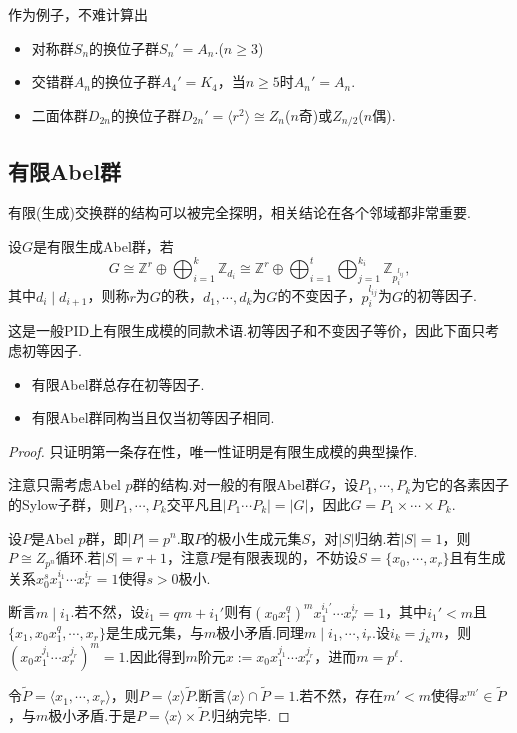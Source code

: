 作为例子，不难计算出
\begin{itemize}
	\item 对称群$S_n$的换位子群$S_n'=A_n$.($n\ge 3$)
	\item 交错群$A_n$的换位子群$A_4'=K_4$，当$n\ge 5$时$A_n'=A_n$.
	\item 二面体群$D_{2n}$的换位子群$D_{2n}'=\langle r^2\rangle\cong Z_n$($n$奇)或$Z_{n/2}$($n$偶).
\end{itemize}

\subsection{有限Abel群}
有限(生成)交换群的结构可以被完全探明，相关结论在各个邻域都非常重要.
\begin{definition}
	设$G$是有限生成Abel群，若
	\[
		G\cong\mathbb{Z}^r\oplus\bigoplus_{i=1}^k\mathbb{Z}_{d_i}\cong\mathbb{Z}^r\oplus\bigoplus_{i=1}^t\bigoplus_{j=1}^{k_i}\mathbb{Z}_{p_i^{l_{ij}}},
	\]
	其中$d_i\mid d_{i+1}$，则称$r$为$G$的{\heiti 秩}，$d_1,\cdots,d_k$为$G$的{\heiti 不变因子}，$p_i^{l_{ij}}$为$G$的{\heiti 初等因子}.
\end{definition}
\begin{remark}
	这是一般PID上有限生成模的同款术语.初等因子和不变因子等价，因此下面只考虑初等因子.
\end{remark}
\begin{thm}[(有限Abel群结构)]
	\begin{itemize}
		\item 有限Abel群总存在初等因子.
		\item 有限Abel群同构当且仅当初等因子相同.
	\end{itemize}\hypertarget{thm:FiniteAbelStruc}{}
\end{thm}
\begin{proof}
	只证明第一条存在性，唯一性证明是有限生成模的典型操作.
	
	注意只需考虑Abel $p$群的结构.对一般的有限Abel群$G$，设$P_1,\cdots,P_k$为它的各素因子的Sylow子群，则$P_1,\cdots,P_k$交平凡且$|P_1\cdots P_k|=|G|$，因此$G=P_1\times\cdots\times P_k$.

	设$P$是Abel $p$群，即$|P|=p^n$.取$P$的极小生成元集$S$，对$|S|$归纳.若$|S|=1$，则$P\cong Z_{p^n}$循环.若$|S|=r+1$，注意$P$是有限表现的，不妨设$S=\{x_0,\cdots,x_r\}$且有生成关系$x_0^sx_1^{i_1}\cdots x_r^{i_r}=1$使得$s>0$极小.

	断言$m\mid i_1$.若不然，设$i_1=qm+i_1'$则有$(x_0x_1^q)^mx_1^{i_1'}\cdots x_r^{i_r}=1$，其中$i_1'<m$且$\{x_1,x_0x_1^q,\cdots,x_r\}$是生成元集，与$m$极小矛盾.同理$m\mid i_1,\cdots,i_r$.设$i_k=j_km$，则$(x_0x_1^{j_1}\cdots x_r^{j_r})^m=1$.因此得到$m$阶元$x:=x_0x_1^{j_1}\cdots x_r^{j_r}$，进而$m=p^\ell$.

	令$\tilde P=\langle x_1,\cdots,x_r\rangle $，则$P=\langle x\rangle \tilde P$.断言$\langle x\rangle \cap\tilde{P}=1$.若不然，存在$m'<m$使得$x^{m'}\in\tilde{P}$，与$m$极小矛盾.于是$P=\langle x\rangle \times\tilde{P}$.归纳完毕.
\end{proof}

